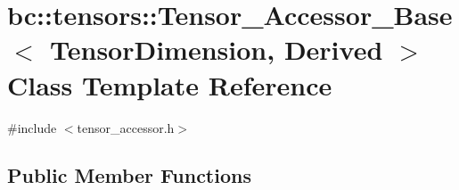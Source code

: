 \hypertarget{classbc_1_1tensors_1_1Tensor__Accessor__Base}{}\section{bc\+:\+:tensors\+:\+:Tensor\+\_\+\+Accessor\+\_\+\+Base$<$ Tensor\+Dimension, Derived $>$ Class Template Reference}
\label{classbc_1_1tensors_1_1Tensor__Accessor__Base}


{\ttfamily \#include $<$tensor\+\_\+accessor.\+h$>$}

\subsection*{Public Member Functions}
